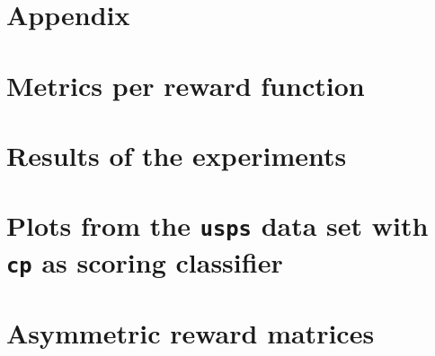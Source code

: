 \documentclass[twoside,11pt]{article}
\begin{document}
\renewcommand{\appendixpagename}{}
\begin{appendices}
  \section*{Appendix}

  \section{Metrics per reward function}
  \label{sec:metrics_rew}

  

  \newpage

  \section{Results of the experiments}
  \label{sec:res}

  

  \newpage

  \section{Plots from the \texttt{usps} data set with
    \texttt{cp} as scoring classifier}
  \label{sec:plots}

  

  \newpage

  \section{Asymmetric reward matrices}
  \label{sec:asym_rew_mat}

  \setcounter{MaxMatrixCols}{11}


\end{appendices}
\end{document}
